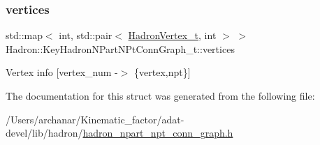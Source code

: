 \subsubsection{\texorpdfstring{vertices}{vertices}}
{\footnotesize\ttfamily std\+::map$<$ int, std\+::pair$<$ \mbox{\hyperlink{structHadron_1_1HadronVertex__t}{Hadron\+Vertex\+\_\+t}}, int $>$ $>$ Hadron\+::\+Key\+Hadron\+N\+Part\+N\+Pt\+Conn\+Graph\+\_\+t\+::vertices}

Vertex info \mbox{[}vertex\+\_\+num -\/$>$ \{vertex,npt\}\mbox{]} 

The documentation for this struct was generated from the following file\+:\begin{DoxyCompactItemize}
\item 
/\+Users/archanar/\+Kinematic\+\_\+factor/adat-\/devel/lib/hadron/\mbox{\hyperlink{adat-devel_2lib_2hadron_2hadron__npart__npt__conn__graph_8h}{hadron\+\_\+npart\+\_\+npt\+\_\+conn\+\_\+graph.\+h}}\end{DoxyCompactItemize}
